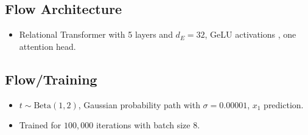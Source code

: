 \subsection*{Flow Architecture}
\begin{itemize}
    \item Relational Transformer \citep{diaoRelationalAttentionGeneralizing2023,kofinasGraphNeuralNetworks2024} with 5 layers and $d_E = 32$, GeLU activations \citep{hendrycksGaussianErrorLinear2023a}, one attention head. 
\end{itemize}

\subsection*{Flow/Training}
\begin{itemize}
    \item $t \sim \text{Beta}(1, 2)$, Gaussian probability path with $\sigma = 0.00001$, $x_1$ prediction.
    \item Trained for $100,000$ iterations with batch size 8. 
\end{itemize}


